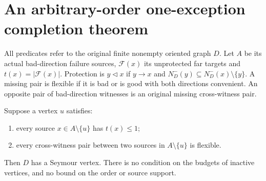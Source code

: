 \section{An arbitrary-order one-exception completion theorem}
\label{sec:one-exception-short-proof}

All predicates refer to the original finite nonempty oriented graph $D$.
Let $A$ be its actual bad-direction failure sources, $\mathcal F(x)$
its unprotected far targets and $t(x)=|\mathcal F(x)|$. Protection is
$y\triangleleft x$ if $y\to x$ and
$N_D^-(y)\subseteq N_D^-(x)\setminus\{y\}$.
A missing pair is flexible if it is bad or is good with both directions
convenient. An opposite pair of bad-direction witnesses is an original
missing cross-witness pair.

\begin{theorem}
\label{thm:one-exception-short-general}
Suppose a vertex $u$ satisfies:
\begin{enumerate}
\item every source $x\in A\setminus\{u\}$ has $t(x)\le1$;
\item every cross-witness pair between two sources in
$A\setminus\{u\}$ is flexible.
\end{enumerate}
Then $D$ has a Seymour vertex. There is no condition on the budgets
of inactive vertices, and no bound on the order or source support.
\end{theorem}
